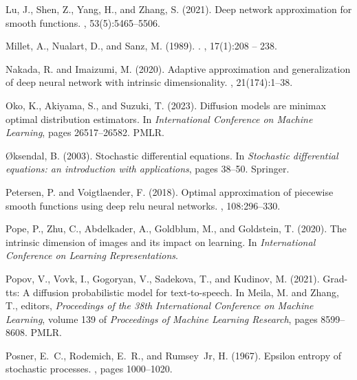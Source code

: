 \documentclass[12pts]{article}
\begin{document}
\begin{thebibliography}{}
Lu, J., Shen, Z., Yang, H., and Zhang, S. (2021).
\newblock Deep network approximation for smooth functions.
, 53(5):5465--5506.

Millet, A., Nualart, D., and Sanz, M. (1989).
.
, 17(1):208 -- 238.

Nakada, R. and Imaizumi, M. (2020).
\newblock Adaptive approximation and generalization of deep neural network with intrinsic dimensionality.
, 21(174):1--38.

Oko, K., Akiyama, S., and Suzuki, T. (2023).
\newblock Diffusion models are minimax optimal distribution estimators.
\newblock In {\em International Conference on Machine Learning}, pages 26517--26582. PMLR.

{\O}ksendal, B. (2003).
\newblock Stochastic differential equations.
\newblock In {\em Stochastic differential equations: an introduction with applications}, pages 38--50. Springer.

Petersen, P. and Voigtlaender, F. (2018).
\newblock Optimal approximation of piecewise smooth functions using deep relu neural networks.
, 108:296--330.

Pope, P., Zhu, C., Abdelkader, A., Goldblum, M., and Goldstein, T. (2020).
\newblock The intrinsic dimension of images and its impact on learning.
\newblock In {\em International Conference on Learning Representations}.

Popov, V., Vovk, I., Gogoryan, V., Sadekova, T., and Kudinov, M. (2021).
\newblock Grad-tts: A diffusion probabilistic model for text-to-speech.
\newblock In Meila, M. and Zhang, T., editors, {\em Proceedings of the 38th International Conference on Machine Learning}, volume 139 of {\em Proceedings of Machine Learning Research}, pages 8599--8608. PMLR.

Posner, E.~C., Rodemich, E.~R., and Rumsey~Jr, H. (1967).
\newblock Epsilon entropy of stochastic processes.
, pages 1000--1020.


\end{thebibliography}
\end{document}

